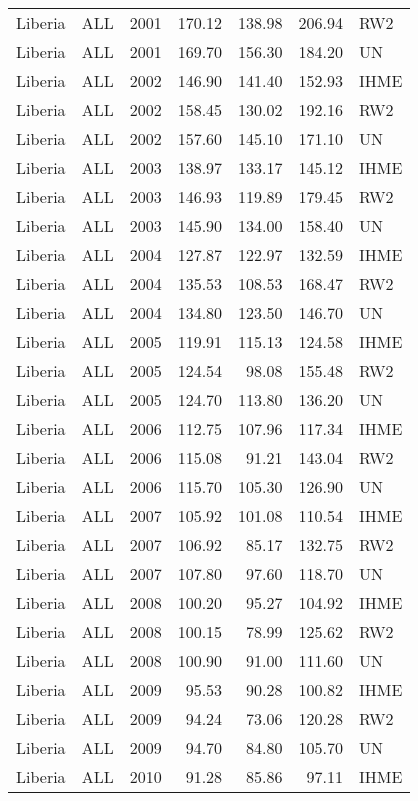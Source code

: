 \begin{longtable}{lllrrrl}
  Liberia & ALL & 2001 & 170.12 & 138.98 & 206.94 & RW2 \\ 
  Liberia & ALL & 2001 & 169.70 & 156.30 & 184.20 & UN \\ 
  Liberia & ALL & 2002 & 146.90 & 141.40 & 152.93 & IHME \\ 
  Liberia & ALL & 2002 & 158.45 & 130.02 & 192.16 & RW2 \\ 
  Liberia & ALL & 2002 & 157.60 & 145.10 & 171.10 & UN \\ 
  Liberia & ALL & 2003 & 138.97 & 133.17 & 145.12 & IHME \\ 
  Liberia & ALL & 2003 & 146.93 & 119.89 & 179.45 & RW2 \\ 
  Liberia & ALL & 2003 & 145.90 & 134.00 & 158.40 & UN \\ 
  Liberia & ALL & 2004 & 127.87 & 122.97 & 132.59 & IHME \\ 
  Liberia & ALL & 2004 & 135.53 & 108.53 & 168.47 & RW2 \\ 
  Liberia & ALL & 2004 & 134.80 & 123.50 & 146.70 & UN \\ 
  Liberia & ALL & 2005 & 119.91 & 115.13 & 124.58 & IHME \\ 
  Liberia & ALL & 2005 & 124.54 & 98.08 & 155.48 & RW2 \\ 
  Liberia & ALL & 2005 & 124.70 & 113.80 & 136.20 & UN \\ 
  Liberia & ALL & 2006 & 112.75 & 107.96 & 117.34 & IHME \\ 
  Liberia & ALL & 2006 & 115.08 & 91.21 & 143.04 & RW2 \\ 
  Liberia & ALL & 2006 & 115.70 & 105.30 & 126.90 & UN \\ 
  Liberia & ALL & 2007 & 105.92 & 101.08 & 110.54 & IHME \\ 
  Liberia & ALL & 2007 & 106.92 & 85.17 & 132.75 & RW2 \\ 
  Liberia & ALL & 2007 & 107.80 & 97.60 & 118.70 & UN \\ 
  Liberia & ALL & 2008 & 100.20 & 95.27 & 104.92 & IHME \\ 
  Liberia & ALL & 2008 & 100.15 & 78.99 & 125.62 & RW2 \\ 
  Liberia & ALL & 2008 & 100.90 & 91.00 & 111.60 & UN \\ 
  Liberia & ALL & 2009 & 95.53 & 90.28 & 100.82 & IHME \\ 
  Liberia & ALL & 2009 & 94.24 & 73.06 & 120.28 & RW2 \\ 
  Liberia & ALL & 2009 & 94.70 & 84.80 & 105.70 & UN \\ 
  Liberia & ALL & 2010 & 91.28 & 85.86 & 97.11 & IHME \\ 

\end{longtable}
